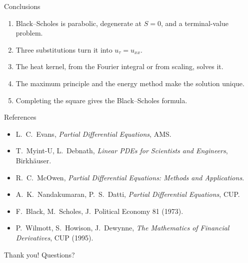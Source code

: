 \documentclass[11pt]{beamer}
\begin{document}
\begin{frame}{Conclusions}
  \begin{enumerate}
    \item Black--Scholes is parabolic, degenerate at $S=0$, and a terminal-value problem.
    \item Three substitutions turn it into $u_\tau=u_{xx}$.
    \item The heat kernel, from the Fourier integral or from scaling, solves it.
    \item The maximum principle and the energy method make the solution unique.
    \item Completing the square gives the Black--Scholes formula.
  \end{enumerate}
\end{frame}

\begin{frame}{References}
  \footnotesize
  \begin{itemize}
    \item L.~C.~Evans, \emph{Partial Differential Equations}, AMS.
    \item T.~Myint-U, L.~Debnath, \emph{Linear PDEs for Scientists and Engineers}, Birkhäuser.
    \item R.~C.~McOwen, \emph{Partial Differential Equations: Methods and Applications}.
    \item A.~K.~Nandakumaran, P.~S.~Datti, \emph{Partial Differential Equations}, CUP.
    \item F.~Black, M.~Scholes, J.\ Political Economy 81 (1973).
    \item P.~Wilmott, S.~Howison, J.~Dewynne, \emph{The Mathematics of Financial Derivatives}, CUP (1995).
  \end{itemize}
  \vfill
  \centering\Large Thank you! Questions?
\end{frame}
\end{document}

